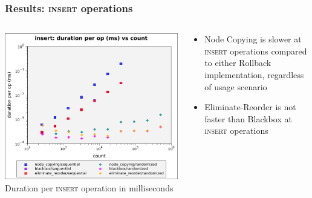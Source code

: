\documentclass[compress]{beamer}
\begin{document}
\begin{frame}
\frametitle{Results: \textsc{insert} operations}
\begin{columns}[t]
  \begin{column}{0.55\textwidth}

      \includegraphics[height=0.65\textheight]{figures/graphs/insert-duration-per-op-vs-count.pdf}
      \newline Duration per \textsc{insert} operation in milliseconds\vphantom{ --- only head node}
  \end{column}

  \begin{column}{0.50\textwidth}
    \begin{itemize}

      \item Node Copying is slower at \textsc{insert} operations compared to either
      Rollback implementation, regardless of usage scenario

      \item Eliminate-Reorder is not faster than Blackbox at \textsc{insert}
      operations

    \end{itemize}
  \end{column}
\end{columns}
\end{frame}
\end{document}
